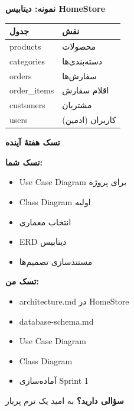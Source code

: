 \documentclass[14pt, a4paper, landscape]{extarticle}
\newcommand{\slide}[1]{%
    \newpage
    \begin{center}
    \begin{minipage}[t]{0.95\textwidth}
    \vspace{0.5cm}
    #1
    \vspace{0.5cm}
    \end{minipage}
    \end{center}
}
\newcommand{\slidetitle}[1]{%
    \begin{center}
        {\LARGE\bfseries\textcolor{primary}{#1}}
    \end{center}
    \vspace{0.5cm}
}
\newcommand{\myaccent}[1]{\textcolor{accent}{#1}}
\begin{document}
\slide{
    \slidetitle{نمونه: دیتابیس HomeStore}
    \vspace{0.5cm}
    \begin{center}
        \begin{tabular}{ll}
            \toprule
            \textbf{جدول} & \textbf{نقش} \\
            \midrule
            products & محصولات \\
            \hline
            categories & دسته‌بندی‌ها \\
            \hline
            orders & سفارش‌ها \\
            \hline
            order\_items & اقلام سفارش \\
            \hline
            customers & مشتریان \\
            \hline
            users & کاربران (ادمین) \\
            \bottomrule
        \end{tabular}
    \end{center}
}

\slide{
    \slidetitle{تسک هفتهٔ آینده}
    \vspace{0.5cm}
    \begin{minipage}[t]{0.48\textwidth}
        {\bfseries\textcolor{primary}{تسک شما:}}
        \vspace{0.3cm}
        \begin{itemize}[itemsep=0.3em]
            \item Use Case Diagram برای پروژه
            \item Class Diagram اولیه
            \item انتخاب معماری
            \item ERD دیتابیس
            \item مستندسازی تصمیم‌ها
        \end{itemize}
    \end{minipage}
    \hfill
    \begin{minipage}[t]{0.48\textwidth}
        {\bfseries\myaccent{تسک من:}}
        \vspace{0.3cm}
        \begin{itemize}[itemsep=0.3em]
            \item architecture.md در HomeStore
            \item database-schema.md
            \item Use Case Diagram
            \item Class Diagram
            \item آماده‌سازی Sprint 1
        \end{itemize}
    \end{minipage}
}

\slide{
    \begin{center}
        \vspace{3cm}
        {\Huge\bfseries سؤالی دارید؟}
        \vspace{1.5cm}
        {\LARGE\myaccent{به امید یک ترم پربار}}
    \end{center}
}
\end{document}

